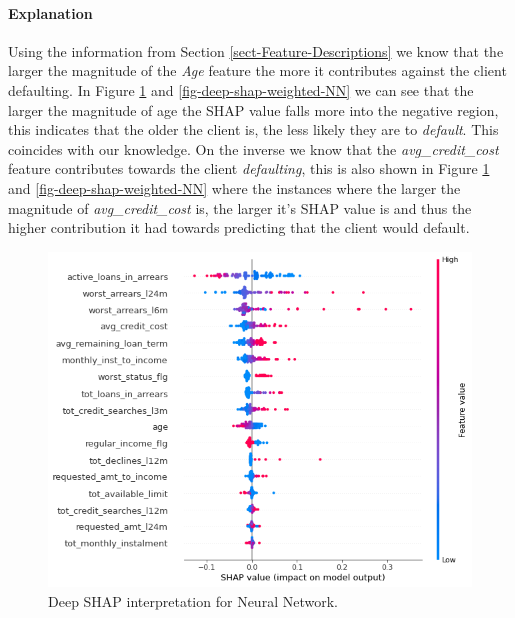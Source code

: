 \paragraph{Explanation}
Using the information from Section \ref{sect-Feature-Descriptions} we know that the larger the magnitude of the \emph{Age} feature the more it contributes against the client defaulting. In Figure \ref{fig-deep-shap-NN} and \ref{fig-deep-shap-weighted-NN} we can see that the larger the magnitude of age the SHAP value falls more into the negative region, this indicates that the older the client is, the less likely they are to \emph{default}. This coincides with our knowledge. On the inverse we know that the \emph{avg\_credit\_cost} feature contributes towards the client \emph{defaulting}, this is also shown in Figure \ref{fig-deep-shap-NN} and \ref{fig-deep-shap-weighted-NN} where the instances where the larger the magnitude of \emph{avg\_credit\_cost} is, the larger it's SHAP value is and thus the higher contribution it had towards predicting that the client would default.

\begin  {figure}[!htpb]
\centering
  \includegraphics[width=0.8\linewidth]{Credit_Images/NN_shap_deep_summary.png}
   \caption{Deep SHAP interpretation for Neural Network.}
    \label{fig-deep-shap-NN}
\end{figure}

